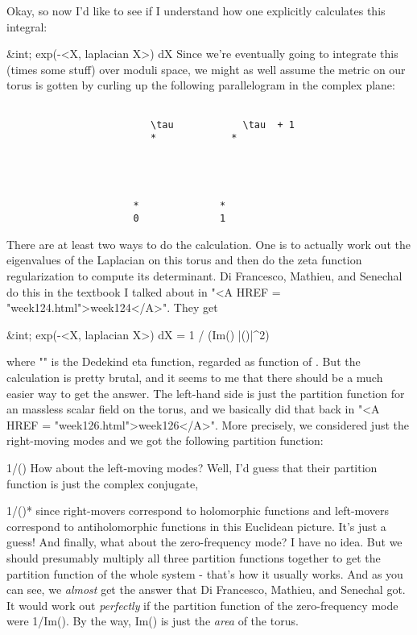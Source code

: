 Okay, so now I'd like to see if I understand how one explicitly
calculates this integral:

                 &int; exp(-<X, laplacian X>) dX
Since we're eventually going to integrate this (times some stuff) over
moduli space, we might as well assume the metric on our torus is gotten
by curling up the following parallelogram in the complex plane:



\begin{verbatim}

                         \tau            \tau  + 1 
                         *             *




                      *              *
                      0              1
\end{verbatim}
    

There are at least two ways to do the calculation.  One is to actually
work out the eigenvalues of the Laplacian on this torus and then do the
zeta function regularization to compute its determinant.  Di Francesco,
Mathieu, and Senechal do this in the textbook I talked about in "<A
HREF = "week124.html">week124</A>".  They get

      &int; exp(-<X, laplacian X>) dX = 1 / (\sqrt Im(\tau )  |\eta (\tau )|^{2})

where "\eta " is the Dedekind eta function, regarded as function
of \tau .  But the calculation is pretty brutal, and it seems to me that
there should be a much easier way to get the answer.  The left-hand side
is just the partition function for an massless scalar field on the
torus, and we basically did that back in "<A HREF =
"week126.html">week126</A>".  More precisely, we considered just
the right-moving modes and we got the following partition function:

                           1/\eta (\tau )
How about the left-moving modes?  Well, I'd guess that their partition 
function is just the complex conjugate,

                           1/\eta (\tau )*
since right-movers correspond to holomorphic functions and left-movers
correspond to antiholomorphic functions in this Euclidean picture.  It's
just a guess!  And finally, what about the zero-frequency mode?  I have
no idea.  But we should presumably multiply all three partition
functions together to get the partition function of the whole system -
that's how it usually works.  And as you can see, we \emph{almost} get the
answer that Di Francesco, Mathieu, and Senechal got.  It would work out
\emph{perfectly} if the partition function of the zero-frequency mode were
1/\sqrt Im(\tau ).  By the way, Im(\tau ) is just the \emph{area} of the
torus.

